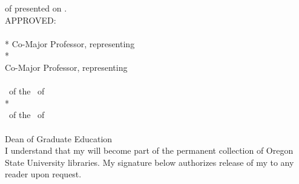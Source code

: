 

  \thispagestyle{empty}
\begin{singlespacing}
	\begin{flushleft}
		\makeatletter
		\noindent
		\ulinewithbreaks{\@degree} \MakeLowercase{\@doctype} of \ulinewithbreaks{\@author} 
		presented on \uline{\@submitdate}. \\
		\vspace{3em}
		APPROVED:\\
		\vspace{3em}
		\hrulefill \\
	\if\@coadvisor *
	\else Co-\fi Major Professor, representing \@major \\
	\vspace{3em}
	\if\@coadvisor *
	\else\hrulefill \\  Co-Major Professor, representing \@twomajor \\
	\vspace{3em}
	\fi
	\hrulefill \\ 
	\@depthead\ of the \@depttype\ of \@department \\
	\vspace{3em}
	\if\@twodepartment * 
	\else
	\hrulefill \\ 
	\@twodepthead\ of the \@twodepttype\ of \@twodepartment \\
	\vspace{3em}
	\fi
	\hrulefill \\
	Dean of Graduate Education \\
	\vfill
	I understand that my \MakeLowercase{\@doctype} will become part of the
	permanent collection of Oregon State University libraries. My signature
	below authorizes release of my \MakeLowercase{\@doctype} to any reader
	upon request.
	\vspace{3em} \\
	\hrulefill \\
	\makeatother
\end{flushleft}
\end{singlespacing}
\newpage
